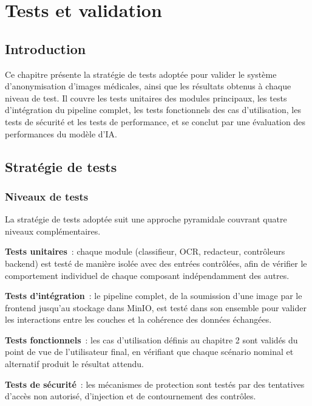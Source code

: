 \chapter{Tests et validation}

\section*{Introduction}
Ce chapitre présente la stratégie de tests adoptée pour valider le système d'anonymisation d'images médicales, ainsi que les résultats obtenus à chaque niveau de test. Il couvre les tests unitaires des modules principaux, les tests d'intégration du pipeline complet, les tests fonctionnels des cas d'utilisation, les tests de sécurité et les tests de performance, et se conclut par une évaluation des performances du modèle d'IA.

\section{Stratégie de tests}

\subsection{Niveaux de tests}

La stratégie de tests adoptée suit une approche pyramidale couvrant quatre niveaux complémentaires.

\textbf{Tests unitaires}~: chaque module (classifieur, OCR, redacteur, contrôleurs backend) est testé de manière isolée avec des entrées contrôlées, afin de vérifier le comportement individuel de chaque composant indépendamment des autres.

\textbf{Tests d'intégration}~: le pipeline complet, de la soumission d'une image par le frontend jusqu'au stockage dans MinIO, est testé dans son ensemble pour valider les interactions entre les couches et la cohérence des données échangées.

\textbf{Tests fonctionnels}~: les cas d'utilisation définis au chapitre 2 sont validés du point de vue de l'utilisateur final, en vérifiant que chaque scénario nominal et alternatif produit le résultat attendu.

\textbf{Tests de sécurité}~: les mécanismes de protection sont testés par des tentatives d'accès non autorisé, d'injection et de contournement des contrôles.

